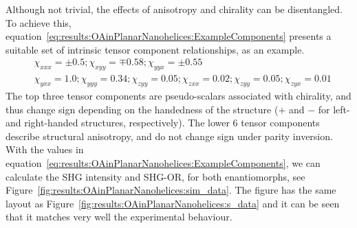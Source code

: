 Although not trivial, the effects of anisotropy and chirality can be disentangled. To achieve this, equation~\ref{eq:results:OAinPlanarNanohelices:ExampleComponents} presents a suitable set of intrinsic tensor component relationships, as an example.
\begin{equation}\label{eq:results:OAinPlanarNanohelices:ExampleComponents}
	\begin{split}
		& \chi_{xxx} = \pm 0.5; \chi_{xyy} = \mp0.58; \chi_{yyx} = \pm 0.55 \\
		& \chi _{yxx} = 1.0; \chi _{yyy} = 0.34; \chi _{zyy} = 0.05; \chi _{zxx} = 0.02; \chi_{zyy} = 0.05; \chi _{zyx} = 0.01
	\end{split}
\end{equation}
The top three tensor components are pseudo-scalars associated with chirality, and thus change sign depending on the handedness of the structure ($+$ and $-$ for left- and right-handed structures, respectively). 
The lower 6 tensor components describe structural anisotropy, and do not change sign under parity inversion. 
With the values in equation~\ref{eq:results:OAinPlanarNanohelices:ExampleComponents}, we can calculate the SHG intensity and SHG-OR, for both enantiomorphs, see Figure~\ref{fig:results:OAinPlanarNanohelices:sim_data}. 
The figure has the same layout as Figure~\ref{fig:results:OAinPlanarNanohelices:s_data} and it can be seen that it matches very well the experimental behaviour. 
